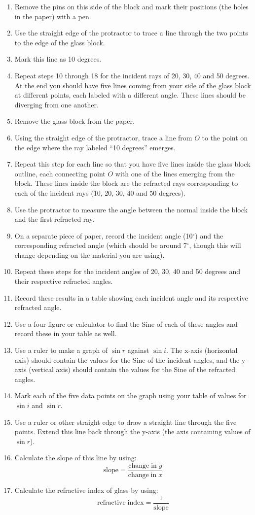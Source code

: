 \begin{enumerate}
\item{Remove the pins on this side of the block and mark their positions (the holes in the paper) with a pen.} 
\item{Use the straight edge of the protractor to trace a line through the two points to the edge of the glass block.} 
\item{Mark this line as 10 degrees.} 
\item{Repeat steps 10 through 18 for the incident rays of 20, 30, 40 and 50 degrees. At the end you should have five lines coming from your side of the glass block at different points, each labeled with a different angle. These lines should be diverging from one another.} 
\item{Remove the glass block from the paper.} 
\item{Using the straight edge of the protractor, trace a line from $O$ to the point on the edge where the ray labeled ``10 degrees'' emerges.} 
\item{Repeat this step for each line so that you have five lines inside the glass block outline, each connecting point $O$ with one of the lines emerging from the block. These lines inside the block are the refracted rays corresponding to each of the incident rays (10, 20, 30, 40 and 50 degrees).} 
\item{Use the protractor to measure the angle between the normal inside the block and the first refracted ray.} 
\item{On a separate piece of paper, record the incident angle (10$^{\circ}$) and the corresponding refracted angle (which should be around 7$^{\circ}$, though this will change depending on the material you are using).} 
\item{Repeat these steps for the incident angles of 20, 30, 40 and 50 degrees and their respective refracted angles.} 
\item{Record these results in a table showing each incident angle and its respective refracted angle.} 
\item{Use a four-figure or calculator to find the Sine of each of these angles and record these in your table as well.} 
\item{Use a ruler to make a graph of $\sin r$ against $\sin i$. The x-axis (horizontal axis) should contain the values for the Sine of the incident angles, and the y-axis (vertical axis) should contain the values for the Sine of the refracted angles.} 
\item{Mark each of the five data points on the graph using your table of values for $\sin i$ and $\sin r$.} 
\item{Use a ruler or other straight edge to draw a straight line through the five points. Extend this line back through the y-axis (the axis containing values of $\sin r$).} 
\item{Calculate the slope of this line by using:%
$$\mathrm{slope} = \frac{\mathrm{change \;in \;}y}{\mathrm{change \;in \;}x}$$}
\item{Calculate the refractive index of glass by using:%
$$\mathrm{refractive \;index} = \frac{1}{\mathrm{slope}}$$} 
\end{enumerate}

